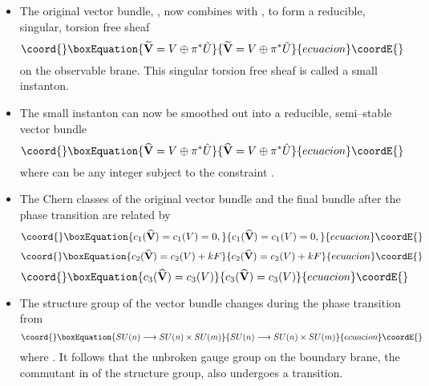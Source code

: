 \documentclass[a4paper,12pt]{article}
\numberwithin{equation}{section}
\providecommand{\bV}{{\mathbf V}}
\theoremstyle{plain}
\begin{document}
\begin{itemize}
\item The original vector bundle, \coordHE{}, now combines with 
\coordHE{}, to form a reducible, singular, torsion free sheaf
\begin{equation}\coord{}\boxEquation{
\widetilde{\bV}= V \oplus \pi^{*}\tilde{U}
\label{eq:187}
}{
\widetilde{\bV}= V \oplus \pi^{*}\tilde{U}
}{ecuacion}\coordE{}\end{equation}
on the observable brane. 
This singular torsion free sheaf is called a small instanton.

\item The small instanton can now be smoothed out into a reducible,
semi--stable \coordHE{} vector bundle 
\begin{equation}\coord{}\boxEquation{
\widehat{\bV}= V \oplus \pi^{*}\hat{U}
\label{eq:188}
}{
\widehat{\bV}= V \oplus \pi^{*}\hat{U}
}{ecuacion}\coordE{}\end{equation}
where \coordHE{} can be any integer subject to the constraint \coordHE{}.


\item The Chern classes of the original vector bundle \coordHE{} and the final bundle
\myHighlight{$\widehat{\bV}$}\coordHE{} after the phase transition are related by
\begin{equation}\coord{}\boxEquation{
c_{1}(\widehat{\bV})=c_{1}(V)=0,
\label{eq:189}
}{
c_{1}(\widehat{\bV})=c_{1}(V)=0,
}{ecuacion}\coordE{}\end{equation}
\begin{equation}\coord{}\boxEquation{
c_{2}(\widehat{\bV})=c_{2}(V) +kF
\label{eq:190}
}{
c_{2}(\widehat{\bV})=c_{2}(V) +kF
}{ecuacion}\coordE{}\end{equation}
\begin{equation}\coord{}\boxEquation{
c_{3}(\widehat{\bV})=c_{3}(V)
\label{eq:191}
}{
c_{3}(\widehat{\bV})=c_{3}(V)
}{ecuacion}\coordE{}\end{equation}

\item The structure group of the vector bundle changes during the phase
transition from
\begin{equation}\coord{}\boxEquation{
SU(n) \longrightarrow SU(n) \times SU(m)
\label{eq:192}
}{
SU(n) \longrightarrow SU(n) \times SU(m)
}{ecuacion}\coordE{}\end{equation}
where \coordHE{}. It follows that the unbroken gauge group on the
boundary brane, the commutant in \coordHE{} of the structure group,  
also undergoes a transition.

\end{itemize}
\end{document}
